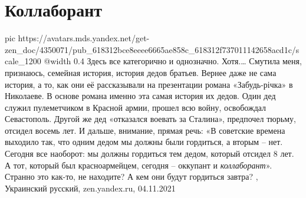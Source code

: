  
 
 
 
 
\chapter{Коллаборант}

\ifcmt
  pic https://avatars.mds.yandex.net/get-zen_doc/4350071/pub_618312bce8eeee6665ae858c_618312f737011142658acd1c/scale_1200
  @width 0.4
\fi
Здесь все категорично и однозначно. Хотя.… Смутила меня, признаюсь, семейная
история, история дедов братьев. Вернее даже не сама история, а то, как они её
рассказывали на презентации романа «Забудь-річка» в Николаеве. В основе романа
именно эта самая история их дедов.  Один дед служил пулеметчиком в Красной
армии, прошел всю войну, освобождал Севастополь. Другой же дед «отказался
воевать за Сталина», предпочел тюрьму, отсидел восемь лет. И дальше, внимание,
прямая речь: «В советские времена выходило так, что одним дедом мы должны были
гордиться, а вторым – нет. Сегодня все наоборот: мы должны гордиться тем дедом,
который отсидел 8 лет. А тот, который был красноармейцем, сегодня – оккупант и
\emph{коллаборант}».  Странно это как-то, не находите? А кем они будут гордиться
завтра?
, Украинский русский, zen.yandex.ru, 04.11.2021
